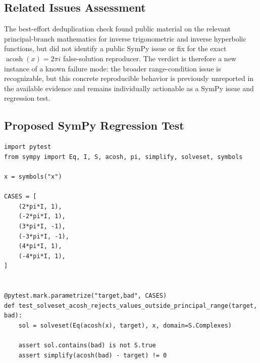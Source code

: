 \documentclass[11pt]{article}
\begin{document}
\subsection{Related Issues Assessment}

The best-effort deduplication check found public material on the relevant
principal-branch mathematics for inverse trigonometric and inverse hyperbolic
functions, but did not identify a public SymPy issue or fix for the exact
\(\operatorname{acosh}(x)=2\pi i\) false-solution reproducer.  The verdict is
therefore a new instance of a known failure mode: the broader range-condition
issue is recognizable, but this concrete reproducible behavior is previously
unreported in the available evidence and remains individually actionable as a
SymPy issue and regression test.

\subsection{Proposed SymPy Regression Test}

\medskip

\begin{lstlisting}[style=bugpython]
import pytest
from sympy import Eq, I, S, acosh, pi, simplify, solveset, symbols

x = symbols("x")

CASES = [
    (2*pi*I, 1),
    (-2*pi*I, 1),
    (3*pi*I, -1),
    (-3*pi*I, -1),
    (4*pi*I, 1),
    (-4*pi*I, 1),
]


@pytest.mark.parametrize("target,bad", CASES)
def test_solveset_acosh_rejects_values_outside_principal_range(target, bad):
    sol = solveset(Eq(acosh(x), target), x, domain=S.Complexes)

    assert sol.contains(bad) is not S.true
    assert simplify(acosh(bad) - target) != 0
\end{lstlisting}
\end{document}
